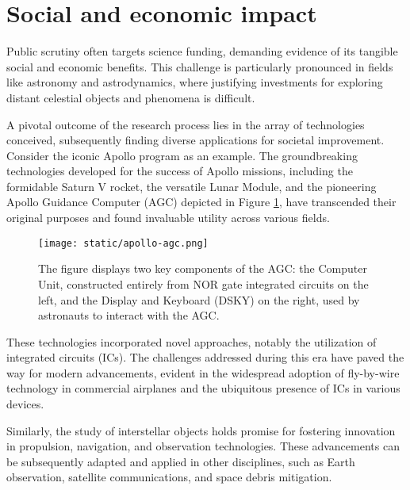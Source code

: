 \section{Social and economic impact}

Public scrutiny often targets science funding, demanding evidence of its
tangible social and economic benefits. This challenge is particularly pronounced
in fields like astronomy and astrodynamics, where justifying investments for
exploring distant celestial objects and phenomena is difficult.

A pivotal outcome of the research process lies in the array of technologies
conceived, subsequently finding diverse applications for societal improvement.
Consider the iconic Apollo program as an example. The groundbreaking
technologies developed for the success of Apollo missions, including the
formidable Saturn V rocket, the versatile Lunar Module, and the pioneering
Apollo Guidance Computer (AGC) depicted in Figure \ref{fig:apollo-agc}, have
transcended their original purposes and found invaluable utility across various
fields.

\begin{figure}[H]
  \centering
  \texttt{[image: static/apollo-agc.png]}
  \caption[Apollo Guidance Computer]{
  The figure displays two key components of the AGC: the Computer Unit,
  constructed entirely from NOR gate integrated circuits on the left, and
  the Display and Keyboard (DSKY) on the right, used by astronauts to
  interact with the AGC.
  }
  \label{fig:apollo-agc}
\end{figure}

These technologies incorporated novel approaches, notably the utilization of
integrated circuits (ICs). The challenges addressed during this era have paved
the way for modern advancements, evident in the widespread adoption of
fly-by-wire technology in commercial airplanes and the ubiquitous presence of
ICs in various devices.

Similarly, the study of interstellar objects holds promise for fostering
innovation in propulsion, navigation, and observation technologies. These
advancements can be subsequently adapted and applied in other disciplines, such
as Earth observation, satellite communications, and space debris mitigation.
